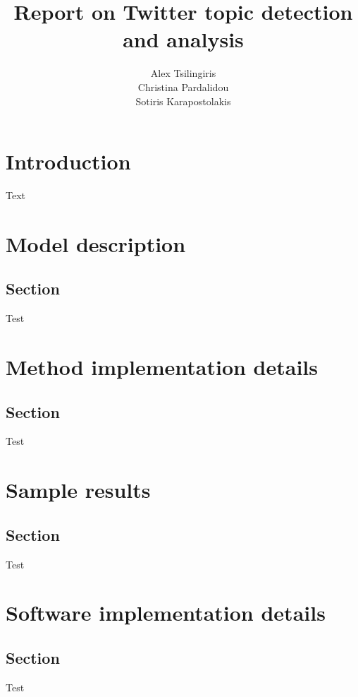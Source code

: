 \documentclass[12pt,svgnames]{report}
\title{Report on Twitter topic detection and analysis}
\author{
Alex Tsilingiris \\
Christina Pardalidou \\
Sotiris Karapostolakis \\
}
\begin{document}
\maketitle
\tableofcontents
\chapter{Introduction}
Text
\chapter{Model description}
\section*{Section}
Test

\chapter{Method implementation details}
\section*{Section}
Test

\chapter{Sample results}
\section*{Section}
Test

\chapter{Software implementation details}
\section*{Section}
Test



\nocite{*}
\end{document}
